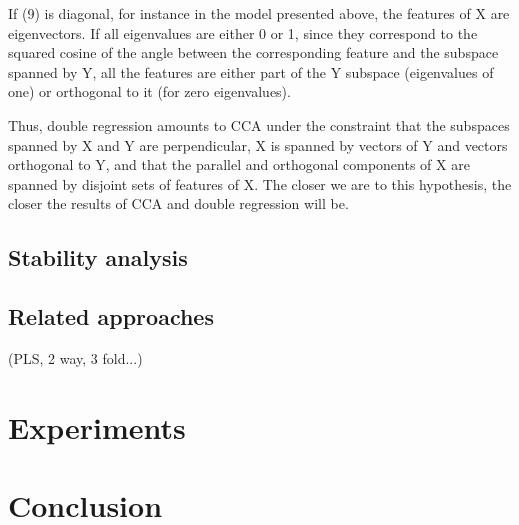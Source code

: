 \documentclass{article}
\begin{document}
If (9) is diagonal, for instance in the model presented above, the features of X are eigenvectors. If all eigenvalues are either 0 or 1, since they correspond to the squared cosine of the angle between the corresponding feature and the subspace spanned by Y, all the features are either part of the Y subspace (eigenvalues of one) or orthogonal to it (for zero eigenvalues). 

Thus, double regression amounts to CCA under the constraint that the subspaces spanned by X and Y are perpendicular, X is spanned by vectors of Y and vectors orthogonal to Y, and that the parallel and orthogonal components of X are spanned by disjoint sets of features of X. The closer we are to this hypothesis, the closer the results of CCA and double regression will be.

\subsection{Stability analysis}

\subsection{Related approaches}
(PLS, 2 way, 3 fold...)

\section{Experiments}

\section{Conclusion}

\clearpage
\newpage



\end{document}
